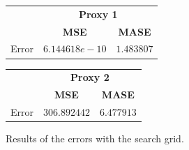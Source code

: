 \begin{figure}[!h]
\centering
\begin{minipage}{\textwidth}
\begin{minipage}{0.5\textwidth}
\begin{center}
\vskip10pt
   \begin{footnotesize}
   \begin{tabular}{|c|c|c|}
   \hline
   & \multicolumn{2}{|c|}{\textbf{Proxy 1}} \\ \cline{2-3}
   & \textbf{MSE} & \textbf{MASE}          \\ \hline
   Error & $6.144618e-10$ & $1.483807$     \\ 
   \hline
   \end{tabular}
   \end{footnotesize}
\end{center}
\end{minipage}
\begin{minipage}{0.5\textwidth}
\begin{center}
\vskip12pt
   \begin{footnotesize}
   \begin{tabular}{|c|c|c|}
   \hline
   & \multicolumn{2}{|c|}{\textbf{Proxy 2}} \\ \cline{2-3}
   & \textbf{MSE} & \textbf{MASE}          \\ \hline
   Error & $306.892442$ & $6.477913$     \\ 
   \hline
   \end{tabular}
   \end{footnotesize}
\end{center}
\end{minipage}
\end{minipage}
\caption{Results of the errors with the search grid.}
\label{fig:table6mNaive}
\end{figure}

